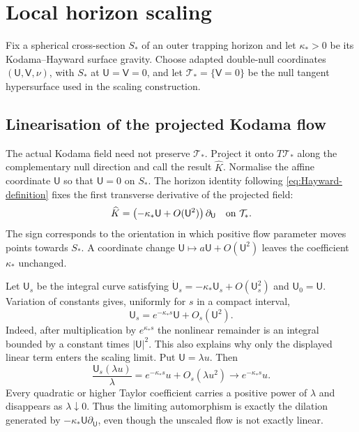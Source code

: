\documentclass[11pt,a4paper]{article}
\theoremstyle{definition}
\theoremstyle{remark}
\begin{document}
	\section{Local horizon scaling}
	\label{sec:scaling}
	
	Fix a spherical cross-section $S_*$ of an outer trapping horizon and let
	$\kappa_*>0$ be its Kodama--Hayward surface gravity.  Choose adapted
	double-null coordinates $(\mathsf U,\mathsf V,\nu)$, with $S_*$ at
	$\mathsf U=\mathsf V=0$, and let $\mathcal T_*=\{\mathsf V=0\}$ be the null
	tangent hypersurface used in the scaling construction.
	
	\subsection{Linearisation of the projected Kodama flow}
	
	The actual Kodama field need not preserve $\mathcal T_*$.  Project it onto
	$T\mathcal T_*$ along the complementary null direction and call the result
	$\widehat K$.  Normalise the affine coordinate $\mathsf U$ so that
	$\mathsf U=0$ on $S_*$.  The horizon identity following
	\eqref{eq:Hayward-definition} fixes the first transverse derivative of the
	projected field:
	\begin{equation}
		\widehat K
		=\left(-\kappa_*\mathsf U+O(\mathsf U^2)\right)\partial_{\mathsf U}
		\quad\hbox{on }\mathcal T_*.
		\label{eq:projected-Kodama-generator}
	\end{equation}
	The sign corresponds to the orientation in which positive flow parameter
	moves points towards $S_*$.  A coordinate change
	$\mathsf U\mapsto a\mathsf U+O(\mathsf U^2)$ leaves the coefficient
	$\kappa_*$ unchanged.
	
	Let $\mathsf U_s$ be the integral curve satisfying
	$\dot{\mathsf U}_s=-\kappa_*\mathsf U_s+O(\mathsf U_s^2)$ and
	$\mathsf U_0=\mathsf U$.  Variation of constants gives, uniformly for $s$ in
	a compact interval,
	\begin{equation}
		\mathsf U_s=e^{-\kappa_*s}\mathsf U+O_s(\mathsf U^2).
		\label{eq:Kodama-dilation}
	\end{equation}
	Indeed, after multiplication by $e^{\kappa_*s}$ the nonlinear remainder is
	an integral bounded by a constant times $|\mathsf U|^2$.  This also explains
	why only the displayed linear term enters the scaling limit.  Put
	$\mathsf U=\lambda u$.  Then
	\begin{equation}
		\frac{\mathsf U_s(\lambda u)}{\lambda}
		=e^{-\kappa_*s}u+O_s(\lambda u^2)
		\longrightarrow e^{-\kappa_*s}u.
		\label{eq:linear-term-survives}
	\end{equation}
	Every quadratic or higher Taylor coefficient carries a positive power of
	$\lambda$ and disappears as $\lambda\downarrow0$.  Thus the limiting
	automorphism is exactly the dilation generated by
	$-\kappa_*\mathsf U\partial_{\mathsf U}$, even though the unscaled flow is not
	exactly linear.
	
\end{document}
